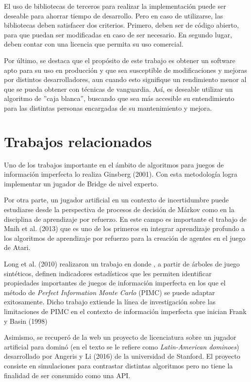 El uso de bibliotecas de terceros para realizar la implementación puede ser
deseable para ahorrar tiempo de desarrollo. Pero en caso de utilizarse, las
bibliotecas deben satisfacer dos criterios. Primero, deben ser de código
abierto, para que puedan ser modificadas en caso de ser necesario. En segundo
lugar, deben contar con una licencia que permita su uso comercial.

Por último, se destaca que el propósito de este trabajo es obtener un software
apto para su uso en producción y que sea susceptible de modificaciones y mejoras
por distintos desarrolladores, aun cuando esto signifique un rendimiento menor
al que se pueda obtener con técnicas de vanguardia. Así, es deseable utilizar un
algoritmo de ''caja blanca'', buscando que sea más accesible su entendimiento
para las distintas personas encargadas de su mantenimiento y mejora.


\section{Trabajos relacionados}

Uno de los trabajos importante en el ámbito de algoritmos  para juegos de
información imperfecta lo realiza Ginsberg  (2001).  Con esta metodología logra
implementar un jugador de Bridge de nivel experto.

Por otra parte, un jugador artificial en un contexto de incertidumbre puede
estudiarse desde la perspectiva de procesos de decisión de Márkov como en la
disciplina de aprendizaje por refuerzo. En este campo es importante el trabajo
de Mnih et al. (2013) que es uno de los primeros en integrar aprendizaje
profundo a los algoritmos de aprendizaje por refuerzo para la creación de
agentes en el juego de Atari.

Long et al. (2010) realizaron un trabajo en donde , a partir de árboles de juego
sintéticos, definen indicadores estadísticos que les permiten identificar
propiedades importantes de juegos de información imperfecta en los que el método
de \textit{Perfect Information Monte Carlo} (PIMC)  se puede adaptar
exitosamente. Dicho trabajo extiende la línea de investigación sobre las
limitaciones de PIMC en el contexto de información imperfecta que inician Frank
y Basin (1998)

Asimismo, se recuperó de la web un proyecto de licenciatura sobre un jugador
artificial para dominó (en el texto se le refiere como \textit{Latin-American
dominoes}) desarrollado por Angeris y Li (2016) de la universidad de Stanford.
El proyecto consiste en simulaciones para contrastar distintas algoritmos pero
no tiene la finalidad de ser consumido como una API.

